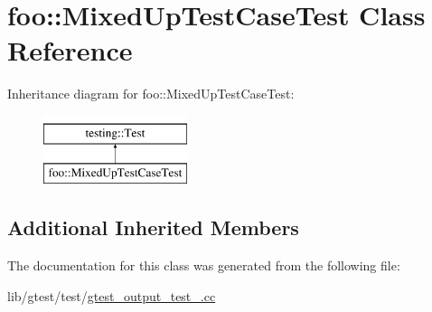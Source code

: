 \hypertarget{classfoo_1_1_mixed_up_test_case_test}{\section{foo\-:\-:Mixed\-Up\-Test\-Case\-Test Class Reference}
\label{classfoo_1_1_mixed_up_test_case_test}
}
Inheritance diagram for foo\-:\-:Mixed\-Up\-Test\-Case\-Test\-:\begin{figure}[H]
\begin{center}
\leavevmode
\includegraphics[height=2.000000cm]{classfoo_1_1_mixed_up_test_case_test}
\end{center}
\end{figure}
\subsection*{Additional Inherited Members}


The documentation for this class was generated from the following file\-:\begin{DoxyCompactItemize}
\item 
lib/gtest/test/\hyperlink{gtest__output__test___8cc}{gtest\-\_\-output\-\_\-test\-\_\-.\-cc}\end{DoxyCompactItemize}
